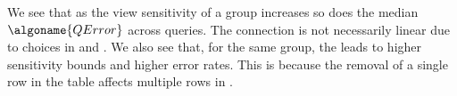 We see that as the view sensitivity of a group increases so does the median $\algoname{QError}$ across queries. The connection is not necessarily linear due to choices in  and .
We also see that, for the same group, the \householdPolicy leads to higher sensitivity bounds and higher error rates. This is because the removal of a single row  in the \housing table affects multiple rows in \persons.





